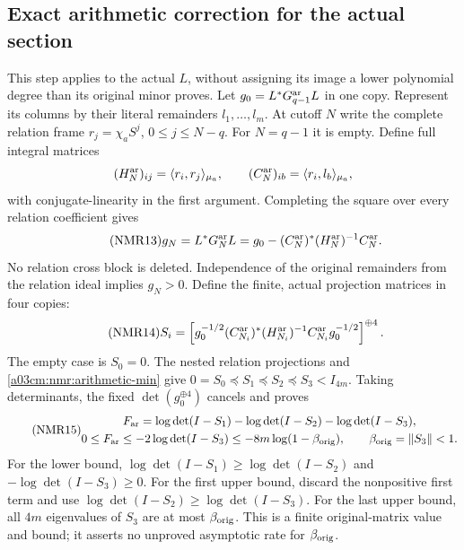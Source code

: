 \documentclass[11pt,a4paper]{article}
\begin{document}
\subsection{Exact arithmetic correction for the actual section}
This step applies to the actual $L$, without assigning its image a
lower polynomial degree than its original minor proves.
Let $g_0=L^*G_{q-1}^{\rm ar}L$ in one copy.
Represent its columns by their literal remainders $l_1,\ldots,l_m$.
At cutoff $N$ write the complete relation frame
$r_j=\chi_aS^j$, $0\leq j\leq N-q$.
For $N=q-1$ it is empty. Define full integral matrices
\[
(H_N^{\rm ar})_{ij}=\langle r_i,r_j\rangle_{\mu_a},\qquad
(C_N^{\rm ar})_{ib}=\langle r_i,l_b\rangle_{\mu_a},
\]
with conjugate-linearity in the first argument. Completing the square
over every relation coefficient gives
\begin{equation}\tag{NMR13}\label{a03cm:nmr:arithmetic-min}
g_N=L^*G_N^{\rm ar}L
 =g_0-(C_N^{\rm ar})^*(H_N^{\rm ar})^{-1}C_N^{\rm ar}.
\end{equation}
No relation cross block is deleted. Independence of the original
remainders from the relation ideal implies $g_N>0$.
Define the finite, actual projection matrices in four copies:
\begin{equation}\tag{NMR14}\label{a03cm:nmr:projection}
S_i=\left[
g_0^{-1/2}(C_{N_i}^{\rm ar})^*
(H_{N_i}^{\rm ar})^{-1}C_{N_i}^{\rm ar}g_0^{-1/2}
\right]^{\oplus4}.
\end{equation}
The empty case is $S_0=0$. The nested relation projections and
\eqref{a03cm:nmr:arithmetic-min} give
$0=S_0\preceq S_1\preceq S_2\preceq S_3<I_{4m}$.
Taking determinants, the fixed $\det(g_0^{\oplus4})$ cancels and
proves
\begin{equation}\tag{NMR15}\label{a03cm:nmr:Far}
\begin{gathered}
F_{\rm ar}
=\log\det(I-S_1)-\log\det(I-S_2)-\log\det(I-S_3),\\
0\leq F_{\rm ar}\leq-2\log\det(I-S_3)
              \leq-8m\log(1-\beta_{\rm orig}),\qquad
\beta_{\rm orig}=\|S_3\|<1 .
\end{gathered}
\end{equation}
For the lower bound, $\log\det(I-S_1)\geq\log\det(I-S_2)$
and $-\log\det(I-S_3)\geq0$.
For the first upper bound, discard the nonpositive first term and
use $\log\det(I-S_2)\geq\log\det(I-S_3)$.
For the last upper bound, all $4m$ eigenvalues of $S_3$ are at most
$\beta_{\rm orig}$.
This is a finite original-matrix value and bound; it asserts no
unproved asymptotic rate for $\beta_{\rm orig}$.
\end{document}
